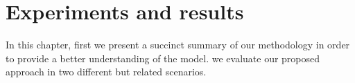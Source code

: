 \newpage
\chapter{Experiments and results}
\label{sec:experiments}

In this chapter, first we present a succinct summary of our methodology in order to provide a better understanding of the model.  
we evaluate our proposed approach in two different but related scenarios. 